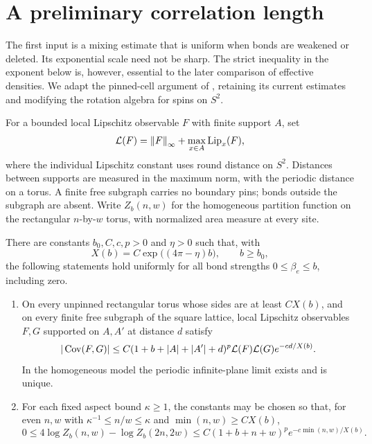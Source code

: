 \section{A preliminary correlation length}\label{sec:preliminary}

The first input is a mixing estimate that is uniform when bonds are
weakened or deleted. Its exponential scale need not be sharp. The strict
inequality in the exponent below is, however, essential to the later
comparison of effective densities. We adapt the pinned-cell argument of
\cite{OpenAI-O4}, retaining its current estimates and modifying the
rotation algebra for spins on $S^2$.

For a bounded local Lipschitz observable $F$ with finite support $A$, set
\[
 \mathcal L(F)=\left\lVert F\right\rVert_\infty+\max_{x\in A}\operatorname{Lip}_x(F),
\]
where the individual Lipschitz constant uses round distance on $S^2$.
Distances between supports are measured in the maximum norm, with the
periodic distance on a torus. A finite free subgraph carries no boundary
pins; bonds outside the subgraph are absent. Write $Z_b(n,w)$ for the
homogeneous partition function on the rectangular $n$-by-$w$ torus,
with normalized area measure at every site.

\begin{proposition}
\label{prop:preliminary}
There are constants $b_0,C,c,p>0$ and $\eta>0$ such that, with
\begin{equation}
 X(b)=C\exp\bigl((4\pi-\eta)b\bigr),\qquad b\ge b_0,
 \label{eq:orig-1}
\end{equation}
the following statements hold uniformly for all bond strengths
$0\le\beta_e\le b$, including zero.
\begin{enumerate}[label=\textup{(\roman*)}]
\item On every unpinned rectangular torus whose sides are at least
$CX(b)$, and on every finite free subgraph of the square lattice, local
Lipschitz observables $F,G$ supported on $A,A'$ at distance $d$ satisfy
\begin{equation}
 |\operatorname{Cov}(F,G)|\le
 C(1+b+|A|+|A'|+d)^p\mathcal L(F)\mathcal L(G)
 e^{-cd/X(b)}.
 \label{eq:prelim-mixing}
\end{equation}
In the homogeneous model the periodic infinite-plane limit exists and
is unique.
\item For each fixed aspect bound $\kappa\ge1$, the constants may be
chosen so that, for even $n,w$ with
$\kappa^{-1}\le n/w\le\kappa$ and $\min(n,w)\ge CX(b)$,
\begin{equation}
 0\le4\log Z_b(n,w)-\log Z_b(2n,2w)
 \le C(1+b+n+w)^p e^{-c\min(n,w)/X(b)}.
 \label{eq:prelim-doubling}
\end{equation}
\end{enumerate}
\end{proposition}

